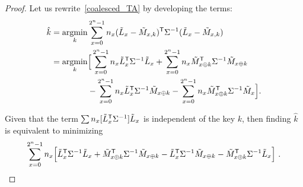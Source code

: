 \documentclass[conference,twocolumn]{IEEEtran}
\DeclareMathOperator*\argmin{argmin}
\begin{document}
\begin{proof}
Let us rewrite~\eqref{coalesced_TA} by developing the terms:
\begin{align*}
 \hat k= \argmin_k& \sum_{x=0}^{2^n-1} n_x(\Tilde{L}_x - \Tilde{M}_{x, k})^\mathsf{T} \Sigma^{-1} (\Tilde{L}_x - \Tilde{M}_{x, k})\\
 = \argmin_k& \Big[ \sum_{x=0}^{2^n-1} n_x \Tilde{L}^\mathsf{T}_x \Sigma^{-1} \Tilde{L}_x +  \sum_{x=0}^{2^n-1} n_x \Tilde{M}^\mathsf{T}_{x\oplus k} \Sigma^{-1} \Tilde{M}_{x\oplus k} \\&- \sum_{x=0}^{2^n-1} n_x \Tilde{L}^\mathsf{T}_x \Sigma^{-1} \Tilde{M}_{x \oplus k}  - \sum_{x=0}^{2^n-1} n_x \Tilde{M}^\mathsf{T}_{x \oplus k} \Sigma^{-1} \Tilde{M}_x \Big] .
\end{align*}


Given that the term $\sum n_x[ \Tilde{L}^\mathsf{T}_x \Sigma^{-1}] \Tilde{L}_x$ is independent of the key $k$,
then finding $\hat k$ is equivalent to minimizing
$$ \sum_{x=0}^{2^n-1} n_x \Big[ \Tilde{L}^\mathsf{T}_x \Sigma^{-1} \Tilde{L}_x +  \Tilde{M}^\mathsf{T}_{x\oplus k} \Sigma^{-1} \Tilde{M}_{x\oplus k} - \Tilde{L}^\mathsf{T}_x \Sigma^{-1} \Tilde{M}_{x \oplus k}  -  \Tilde{M}^\mathsf{T}_{x \oplus k} \Sigma^{-1} \Tilde{L}_x \Big] \ .$$

   


\end{proof}
\end{document}
